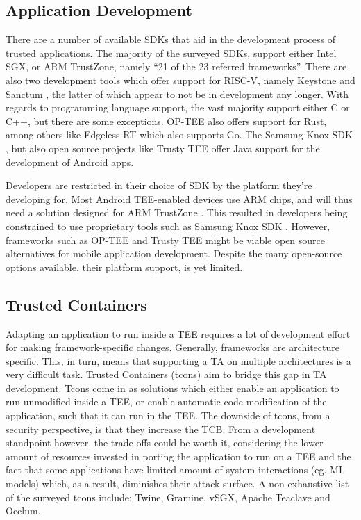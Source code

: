 \documentclass[runningheads,a4paper]{uwsese}
\begin{document}
\subsection{Application Development}

There are a number of available SDKs that aid in the
development process of trusted applications. The majority of the surveyed SDKs,
support either Intel SGX, or ARM TrustZone, namely ``21 of the 23 referred
frameworks''\cite{tee_app_rev}. There are also two development tools which
offer support for RISC-V, namely Keystone \cite{tee_keystone} and Sanctum
\cite{tee_sanctum}, the latter of which appear to not be in development any
longer. With regards to programming language support, the vast majority support
either C or C++, but there are some exceptions. OP-TEE \cite{optee} also offers
support for Rust, among others like Edgeless RT \cite{edgelessrt} which also
supports Go. The Samsung Knox SDK \cite{knox_sdk}, but also open source
projects like Trusty TEE \cite{trustytee} offer Java support for the
development of Android apps.

Developers are restricted in their choice of SDK by the platform they're
developing for. Most Android TEE-enabled devices use ARM chips, and will thus
need a solution designed for ARM TrustZone \cite{arm_tz}. This resulted in
developers being constrained to use proprietary tools such as Samsung Knox SDK
\cite{knox_sdk}. However, frameworks such as OP-TEE \cite{optee} and Trusty TEE
\cite{trustytee} might be viable open source alternatives for mobile
application development. Despite the many open-source options available, their
platform support, is yet limited.

\subsection{Trusted Containers}

Adapting an application to run inside a TEE requires a lot of development
effort for making framework-specific changes. Generally, frameworks are
architecture specific. This, in turn, means that supporting a TA on multiple
architectures is a very difficult task. Trusted Containers (tcons) aim to
bridge this gap in TA development. Tcons come in as solutions which either
enable an application to run unmodified inside a TEE, or enable automatic code
modification of the application, such that it can run in the TEE. The downside
of tcons, from a security perspective, is that they increase the TCB. From a
development standpoint however, the trade-offs could be worth it, considering
the lower amount of resources invested in porting the application to run on a
TEE and the fact that some applications have limited amount of system
interactions (eg. ML models) which, as a result, diminishes their attack
surface. A non exhaustive list of the surveyed tcons include: Twine, Gramine,
vSGX, Apache Teaclave and Occlum. 
\end{document}
